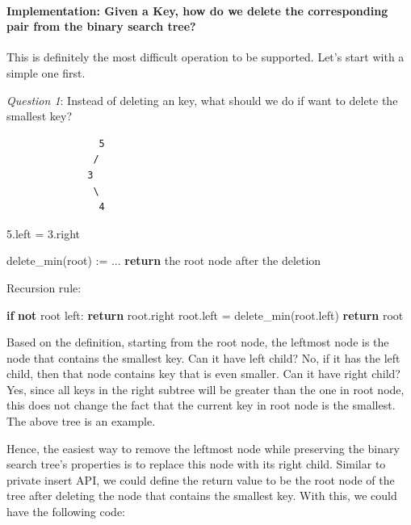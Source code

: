 \documentclass[11pt]{article}
\newenvironment{Shaded}{}{}
\newcommand{\KeywordTok}[1]{\textcolor[rgb]{0.00,0.44,0.13}{\textbf{{#1}}}}
\newcommand{\NormalTok}[1]{{#1}}
\newcommand{\ControlFlowTok}[1]{\textcolor[rgb]{0.00,0.44,0.13}{\textbf{{#1}}}}
\newcommand{\OperatorTok}[1]{\textcolor[rgb]{0.40,0.40,0.40}{{#1}}}
\begin{document}
    \paragraph{Implementation: Given a Key, how do we delete the
corresponding pair from the binary search
tree?}\label{implementation-given-a-key-how-do-we-delete-the-corresponding-pair-from-the-binary-search-tree}

This is definitely the most difficult operation to be supported. Let's
start with a simple one first.

\emph{Question 1}: Instead of deleting an key, what should we do if want
to delete the smallest key?

\begin{verbatim}
                5
               /  
              3    
               \   
                4   
\end{verbatim}

5.left = 3.right

\begin{Shaded}
\begin{Highlighting}[]
\NormalTok{delete_min(root) :}\OperatorTok{=}\NormalTok{ ... }\ControlFlowTok{return}\NormalTok{ the root node after the deletion}
\end{Highlighting}
\end{Shaded}

Recursion rule:

\begin{Shaded}
\begin{Highlighting}[]
\ControlFlowTok{if} \KeywordTok{not}\NormalTok{ root left:}
    \ControlFlowTok{return}\NormalTok{ root.right}
\NormalTok{root.left }\OperatorTok{=}\NormalTok{ delete_min(root.left)}
\ControlFlowTok{return}\NormalTok{ root}
\end{Highlighting}
\end{Shaded}

Based on the definition, starting from the root node, the leftmost node
is the node that contains the smallest key. Can it have left child? No,
if it has the left child, then that node contains key that is even
smaller. Can it have right child? Yes, since all keys in the right
subtree will be greater than the one in root node, this does not change
the fact that the current key in root node is the smallest. The above
tree is an example.

Hence, the easiest way to remove the leftmost node while preserving the
binary search tree's properties is to replace this node with its right
child. Similar to private insert API, we could define the return value
to be the root node of the tree after deleting the node that contains
the smallest key. With this, we could have the following code:
\end{document}
